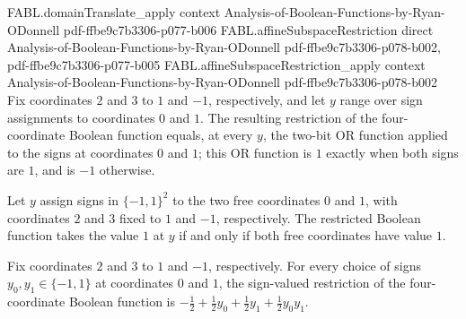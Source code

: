 \begin{theorem}
\proofstep
  {FABL.domainTranslate_apply}
  {context}
  {Analysis-of-Boolean-Functions-by-Ryan-ODonnell}
  {pdf-ffbe9c7b3306-p077-b006}
\proofstep
  {FABL.affineSubspaceRestriction}
  {direct}
  {Analysis-of-Boolean-Functions-by-Ryan-ODonnell}
  {pdf-ffbe9c7b3306-p078-b002,
    pdf-ffbe9c7b3306-p077-b005}
\proofstep
  {FABL.affineSubspaceRestriction_apply}
  {context}
  {Analysis-of-Boolean-Functions-by-Ryan-ODonnell}
  {pdf-ffbe9c7b3306-p078-b002}
Fix coordinates $2$ and $3$ to $1$ and $−1$, respectively, and let $y$ range over sign
assignments to coordinates $0$ and $1$. The resulting restriction of the four-coordinate
Boolean function equals, at every $y$, the two-bit OR function applied to the signs at
coordinates $0$ and $1$; this OR function is $1$ exactly when both signs are $1$, and is
$−1$ otherwise.
\end{theorem}

\begin{theorem}
\label{FABL.example3_19_restriction_eq_one_iff}
\leanok
{}
Let $y$ assign signs in $\{−1,1\}^2$ to the two free coordinates $0$ and $1$, with
coordinates $2$ and $3$ fixed to $1$ and $−1$, respectively. The restricted Boolean
function takes the value $1$ at $y$ if and only if both free coordinates have value $1$.
\end{theorem}

\begin{theorem}
\label{FABL.example3_19_restriction_fourier_expansion}
\leanok
{}
Fix coordinates $2$ and $3$ to $1$ and $−1$, respectively. For every choice of signs
$y_0,y_1\in\{−1,1\}$ at coordinates $0$ and $1$, the sign-valued restriction of the
four-coordinate Boolean function is $−\frac12+\frac12y_0+\frac12y_1+\frac12y_0y_1$.
\end{theorem}

